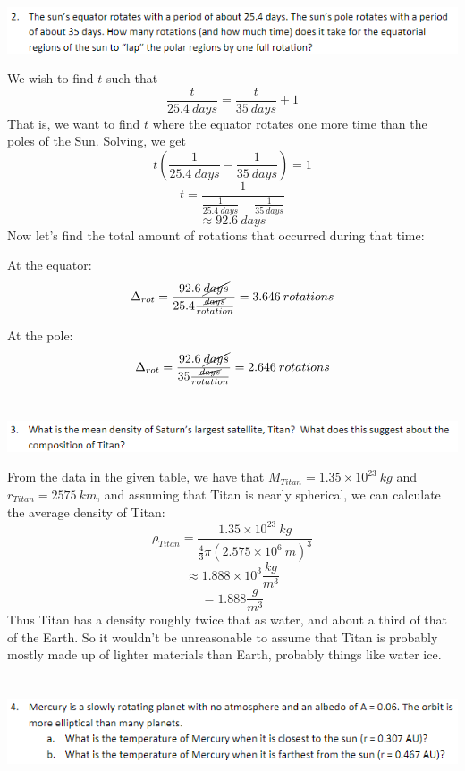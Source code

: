 \documentclass{article}
\begin{document}
\section{}
\includegraphics[scale = 0.8]{probset3num2.PNG}


We wish to find $t$ such that 
\[\frac{t}{25.4 \: days} = \frac{t}{35 \: days} + 1\]
That is, we want to find $t$ where the equator rotates one more time than the poles of the Sun. Solving, we get
\[t(\frac{1}{25.4 \: days} - \frac{1}{35 \: days}) = 1\]
\[t = \frac{1}{\frac{1}{25.4 \: days} - \frac{1}{35 \: days}}\]
\[\approx 92.6 \: days\]
Now let's find the total amount of rotations that occurred during that time:

At the equator: 
\[\Delta_{rot} = \frac{92.6 \: \cancel{days}}{25.4 \frac{\cancel{days}}{rotation}} = 3.646 \: rotations\]

At the pole: 
\[\Delta_{rot} = \frac{92.6 \: \cancel{days}}{35 \frac{\cancel{days}}{rotation}} = 2.646 \: rotations\]




\section{}
\includegraphics[scale = 0.8]{probset3num3.PNG}

From the data in the given table, we have that $M_{Titan} = 1.35 \times 10^{23} \: kg$ and $r_{Titan} = 2575 \: km$, and assuming that Titan is nearly spherical, we can calculate the average density of Titan:
\[\rho_{Titan} = \frac{1.35 \times 10^{23} \: kg}{\frac{4}{3}\pi (2.575 \times 10^6 \:m)^3}\]
\[\approx 1.888 \times 10^3 \frac{kg}{m^3}\]
\[ = 1.888 \frac{g}{m^3}\]
Thus Titan has a density roughly twice that as water, and about a third of that of the Earth. So it wouldn't be unreasonable to assume that Titan is probably mostly made up of lighter materials than Earth, probably things like water ice.




\section{}
\includegraphics[scale = 0.8]{probset3num4.PNG}
\end{document}
